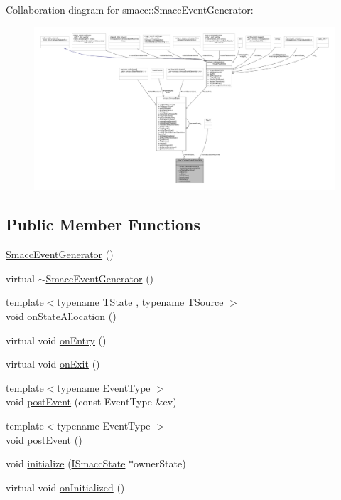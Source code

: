 Collaboration diagram for smacc\+:\+:Smacc\+Event\+Generator\+:
\nopagebreak
\begin{figure}[H]
\begin{center}
\leavevmode
\includegraphics[width=350pt]{classsmacc_1_1SmaccEventGenerator__coll__graph}
\end{center}
\end{figure}
\subsection*{Public Member Functions}
\begin{DoxyCompactItemize}
\item 
\hyperlink{classsmacc_1_1SmaccEventGenerator_a26d17f3c1126a03107d452c95eef5136}{Smacc\+Event\+Generator} ()
\item 
virtual \hyperlink{classsmacc_1_1SmaccEventGenerator_a3032b762f40b72e76d6c5713ee44e138}{$\sim$\+Smacc\+Event\+Generator} ()
\item 
{\footnotesize template$<$typename T\+State , typename T\+Source $>$ }\\void \hyperlink{classsmacc_1_1SmaccEventGenerator_ad6560a6467f5f90863dad91f28b59fd7}{on\+State\+Allocation} ()
\item 
virtual void \hyperlink{classsmacc_1_1SmaccEventGenerator_aa1eb9cc0fd1b3e83cc87d4871fb0f68a}{on\+Entry} ()
\item 
virtual void \hyperlink{classsmacc_1_1SmaccEventGenerator_ac9de300b5316071623b8486cb5b6662e}{on\+Exit} ()
\item 
{\footnotesize template$<$typename Event\+Type $>$ }\\void \hyperlink{classsmacc_1_1SmaccEventGenerator_a0bc8c90df39c07d36f74e3dd60ad5c8d}{post\+Event} (const Event\+Type \&ev)
\item 
{\footnotesize template$<$typename Event\+Type $>$ }\\void \hyperlink{classsmacc_1_1SmaccEventGenerator_a9c1df7c3e6b5ff7bf0da8f6d24fab4bb}{post\+Event} ()
\item 
void \hyperlink{classsmacc_1_1SmaccEventGenerator_a804f2d42ef9a834a2729376de2f2f4e4}{initialize} (\hyperlink{classsmacc_1_1ISmaccState}{I\+Smacc\+State} $\ast$owner\+State)
\item 
virtual void \hyperlink{classsmacc_1_1SmaccEventGenerator_a59a90d4c22d02f72522e94ff71b14d10}{on\+Initialized} ()
\end{DoxyCompactItemize}
